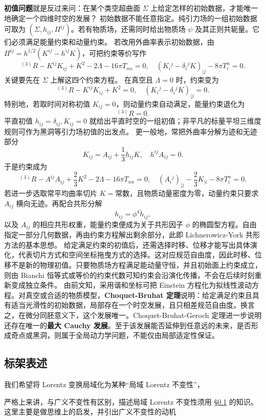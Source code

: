 \textbf{初值问题}就是反过来问：在某个类空超曲面 $\Sigma$ 上给定怎样的初始数据，才能唯一地确定一个四维时空的发展？
初始数据不能任意指定。纯引力场的一组初始数据可取为 $(\Sigma,h_{ij},\Pi^{ij})$。若有物质场，还需同时给出物质场 $\psi$ 及其正则共轭量。它们必须满足能量约束和动量约束。
若改用外曲率表示初始数据，由 $\Pi^{ij}=h^{1/2}(K^{ij}-h^{ij}K)$，可把约束等价写作
\[
    {}^{(3)}R-K^{ij}K_{ij}+K^2-2\Lambda-16\pi T_{nn}=0,\quad (K_i{}^j-\delta_i{}^jK)_{|j}-8\pi T_i^n=0.
\]
关键要先在 $\Sigma$ 上解这四个约束方程。
在真空且 $\Lambda=0$ 时，约束变为
\[
    {}^{(3)}R-K^{ij}K_{ij}+K^2=0,\quad
    (K_i{}^j-\delta_i{}^jK)_{|j}=0.
\]
特别地，若取时间对称初值 $K_{ij}=0$，则动量约束自动满足，能量约束退化为
\[
    {}^{(3)}R=0.
\]
平直初值 $h_{ij}=\delta_{ij},K_{ij}=0$ 就给出平直时空的一组初值；非平凡的标量平坦三维度规则可作为黑洞等引力场初值的出发点。
更一般地，常把外曲率分解为迹和无迹部分
\[
    K_{ij}=A_{ij}+\frac{1}{3}h_{ij}K,\quad h^{ij}A_{ij}=0.
\]
于是约束成为
\[
    {}^{(3)}R-A^{ij}A_{ij}+\frac{2}{3}K^2-2\Lambda-16\pi T_{nn}=0,\quad (A_i{}^j)_{|j}-\frac{2}{3}K_{|i}-8\pi T_i^n=0.
\]
若进一步选取常平均曲率切片 $K=\text{常数}$，且物质动量密度为零，动量约束只要求 $A_{ij}$ 横向无迹。再配合共形分解
\[
    h_{ij}=\phi^4\tilde h_{ij},
\]
以及 $A_{ij}$ 的相应共形权重，能量约束便成为关于共形因子 $\phi$ 的椭圆型方程。自由指定一部分几何数据，再由约束方程解出剩余部分，此即 Lichnerowicz-York 共形方法的基本思想。
给定满足约束的初值后，还需选择时移、位移才能写出具体演化，代表切片方式和空间坐标拖曳方式的选择。这对应规范自由度，因此时移、位移不是新的物理初值。只要物质场方程满足能动量守恒，并且初始面上约束成立，则由 Bianchi 恒等式或等价的约束代数可知约束会沿演化传播，不会在后续时刻重新变成独立条件。
由前文知，采用谐和坐标可把 Einstein 方程化为拟线性波动方程。对真空或合适的物质模型，\textbf{Choquet-Bruhat 定理}说明：给定满足约束且具有适当光滑性的初始数据，局部存在一个时空发展，且只相差规范自由度。换言之，在微分同胚意义下，这个发展唯一。Choquet-Bruhat-Geroch 定理进一步说明还存在唯一的\textbf{最大 Cauchy 发展}。至于该发展能否延伸到任意远的未来，是否形成奇点或黑洞，则属于全局动力学问题，不能仅由局部适定性保证。

\subsection{标架表述}\label{sec:tetrad}

我们希望将 Lorentz 变换局域化为某种“局域 Lorentz 不变性”，

严格上来讲，与广义不变性有区别，描述局域 Lorentz 不变性须用 \S\ref{sec:tetrad} 的知识。
这里主要是做思维上的启发，并引出广义不变性的动机

